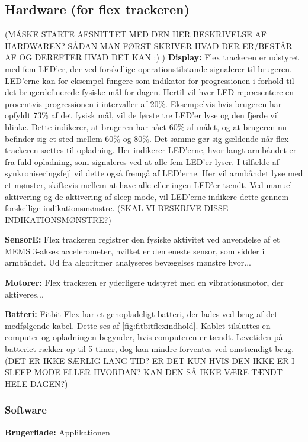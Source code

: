 \subsection{Hardware (for flex trackeren)}
(MÅSKE STARTE AFSNITTET MED DEN HER BESKRIVELSE AF HARDWAREN? SÅDAN MAN FØRST SKRIVER HVAD DER ER/BESTÅR AF OG DEREFTER HVAD DET KAN :) )
\textbf{Display:} 
Flex trackeren er udstyret med fem LED'er, der ved forskellige operationstilstande signalerer til brugeren. 
LED'erne kan for eksempel fungere som indikator for progressionen i forhold til det brugerdefinerede fysiske mål for dagen. Hertil vil hver LED repræsentere en procentvis progressionen i intervaller af $20 \%$. Eksempelvis hvis brugeren har opfyldt $73 \%$ af det fysisk mål, vil de første tre LED'er lyse og den fjerde vil blinke. Dette indikerer, at brugeren har nået $60 \%$ af målet, og at brugeren nu befinder sig et sted mellem $60 \%$ og $80 \%$. 
Det samme gør sig gældende når flex trackeren sættes til opladning. Her indikerer LED'erne, hvor langt armbåndet er fra fuld opladning, som signaleres ved at alle fem LED'er lyser. 
I tilfælde af synkroniseringsfejl vil dette også fremgå af LED'erne. Her vil armbåndet lyse med et mønster, skiftevis mellem at have alle eller ingen LED'er tændt. 
Ved manuel aktivering og de-aktivering af sleep mode, vil LED'erne indikere dette gennem forskellige indikationsmønstre. (SKAL VI BESKRIVE DISSE INDIKATIONSMØNSTRE?)

\textbf{SensorE:} 
Flex trackeren registrer den fysiske aktivitet ved anvendelse af et MEMS 3-akses accelerometer, hvilket er den eneste sensor, som sidder i armbåndet. Ud fra algoritmer analyseres bevægelses mønstre hvor...


\textbf{Motorer:}
Flex trackeren er yderligere udstyret med en vibrationsmotor, der aktiveres... 


\textbf{Batteri:} 
Fitbit Flex har et genopladeligt batteri, der lades ved brug af det medfølgende kabel. Dette ses af \autoref{fig:fitbitflexindhold}. Kablet tilsluttes en computer og opladningen begynder, hvis computeren er tændt. 
Levetiden på batteriet rækker op til 5 timer, dog kan mindre forventes ved omstændigt brug. (DET ER IKKE SÆRLIG LANG TID? ER DET KUN HVIS DEN IKKE ER I SLEEP MODE ELLER HVORDAN? KAN DEN SÅ IKKE VÆRE TÆNDT HELE DAGEN?)


\subsubsection{Software}
\textbf{Brugerflade:} %
Applikationen  

